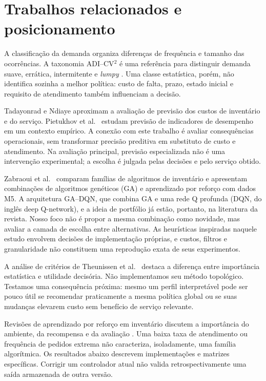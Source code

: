 \documentclass[preprint,12pt]{elsarticle}
\begin{document}
\section{Trabalhos relacionados e posicionamento}
A classificação da demanda organiza diferenças de frequência e tamanho das ocorrências. A taxonomia ADI--CV$^2$ é uma referência para distinguir demanda suave, errática, intermitente e \textit{lumpy} \cite{syntetos2005}. Uma classe estatística, porém, não identifica sozinha a melhor política: custo de falta, prazo, estado inicial e requisito de atendimento também influenciam a decisão.

Tadayonrad e Ndiaye \cite{sca_f81ad2b3e023} aproximam a avaliação de previsão dos custos de inventário e do serviço. Pietukhov et al.\ \cite{sca_92a549559870} estudam previsão de indicadores de desempenho em um contexto empírico. A conexão com este trabalho é avaliar consequências operacionais, sem transformar precisão preditiva em substituto de custo e atendimento. Na avaliação principal, previsão especializada não é uma intervenção experimental; a escolha é julgada pelas decisões e pelo serviço obtido.

Zabraoui et al.\ \cite{sca_27e994c54848} comparam famílias de algoritmos de inventário e apresentam combinações de algoritmos genéticos (GA) e aprendizado por reforço com dados M5. A arquitetura GA--DQN, que combina GA e uma rede Q profunda (DQN, do inglês deep Q-network), e a ideia de portfólio já estão, portanto, na literatura da revista. Nosso foco não é propor a mesma combinação como novidade, mas avaliar a camada de escolha entre alternativas. As heurísticas inspiradas naquele estudo envolvem decisões de implementação próprias, e custos, filtros e granularidade não constituem uma reprodução exata de seus experimentos.

A análise de critérios de Theunissen et al.\ \cite{sca_c5c06dcbc9e5} destaca a diferença entre importância estatística e utilidade decisória. Não implementamos seu método topológico. Testamos uma consequência próxima: mesmo um perfil interpretável pode ser pouco útil se recomendar praticamente a mesma política global ou se suas mudanças elevarem custo sem benefício de serviço relevante.

Revisões de aprendizado por reforço em inventário discutem a importância do ambiente, da recompensa e da avaliação \cite{Boute2022DRLInventoryRoadmap}. Uma baixa taxa de atendimento ou frequência de pedidos extrema não caracteriza, isoladamente, uma família algorítmica. Os resultados abaixo descrevem implementações e matrizes específicas. Corrigir um controlador atual não valida retrospectivamente uma saída armazenada de outra versão.
\end{document}
